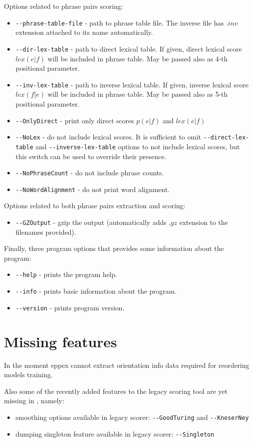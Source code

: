 Options related to phrase pairs scoring:
\begin{itemize}
 \item \verb|--phrase-table-file| - path to phrase table file.
  The inverse file has $.inv$ extension attached to its name automatically.
 \item \verb|--dir-lex-table| - path to direct lexical table.
  If given, direct lexical score $lex(e|f)$ will be included in phrase table.
  May be passed also as 4-th positional parameter.
 \item \verb|--inv-lex-table| - path to inverse lexical table.  
  If given, inverse lexical score $lex(f|e)$ will be included in phrase table.
  May be passed also as 5-th positional parameter.
 \item \verb|--OnlyDirect| - print only direct scores $p(e|f)$ and $lex(e|f)$
 \item \verb|--NoLex| - do not include lexical scores.
  It is sufficient to omit \verb|--direct-lex-table| and \verb|--inverse-lex-table|
  options to not include lexical scores, but this switch can be used to
  override their presence.
 \item \verb|--NoPhraseCount| - do not include phrase counts.  
 \item \verb|--NoWordAlignment| - do not print word alignment.
\end{itemize}

Options related to both phrase pairs extraction and scoring:
\begin{itemize}
 \item \verb|--GZOutput| - gzip the output (automatically
  adds $.gz$ extension to the filenames provided).
\end{itemize}

Finally, three program options that provides some information about the program:
\begin{itemize}
 \item \verb|--help| - prints the program help.
 \item \verb|--info| - prints basic information about the program.
 \item \verb|--version| - prints program version.
\end{itemize}

\section{Missing features}

In the moment eppex cannot extract orientation info data required for reordering models training.

Also some of the recently added features to the legacy scoring tool are yet missing in \eppex{},
namely:
\begin{itemize}
  \item smoothing options available in legacy scorer: \verb|--GoodTuring| and \verb|--KneserNey|
  \item dumping singleton feature available in legacy scorer: \verb|--Singleton|
\end{itemize}
